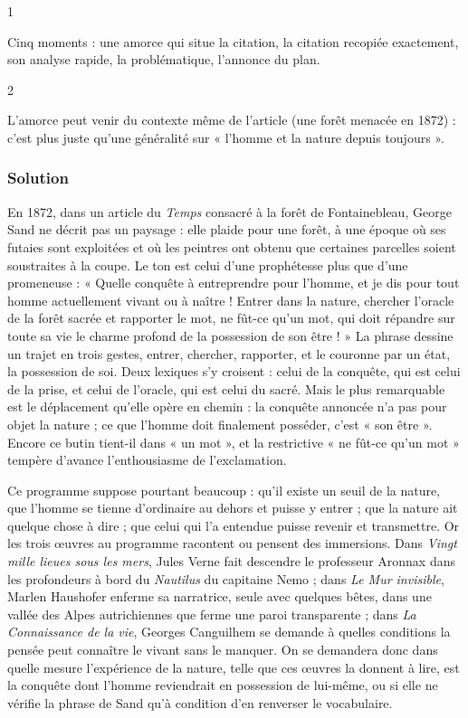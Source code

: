 \documentclass[11pt,a4paper]{article}
\begin{document}
\begin{indication}{1}

Cinq moments : une amorce qui situe la citation, la citation recopiée exactement, son analyse rapide, la problématique, l'annonce du plan.

\end{indication}

\begin{indication}{2}

L'amorce peut venir du contexte même de l'article (une forêt menacée en 1872) : c'est plus juste qu'une généralité sur « l'homme et la nature depuis toujours ».

\end{indication}

\hypertarget{solution-3}{%
\subsubsection{Solution}\label{solution-3}}

En 1872, dans un article du \emph{Temps} consacré à la forêt de Fontainebleau, George Sand ne décrit pas un paysage : elle plaide pour une forêt, à une époque où ses futaies sont exploitées et où les peintres ont obtenu que certaines parcelles soient soustraites à la coupe. Le ton est celui d'une prophétesse plus que d'une promeneuse : « Quelle conquête à entreprendre pour l'homme, et je dis pour tout homme actuellement vivant ou à naître ! Entrer dans la nature, chercher l'oracle de la forêt sacrée et rapporter le mot, ne fût-ce qu'un mot, qui doit répandre sur toute sa vie le charme profond de la possession de son être ! » La phrase dessine un trajet en trois gestes, entrer, chercher, rapporter, et le couronne par un état, la possession de soi. Deux lexiques s'y croisent : celui de la conquête, qui est celui de la prise, et celui de l'oracle, qui est celui du sacré. Mais le plus remarquable est le déplacement qu'elle opère en chemin : la conquête annoncée n'a pas pour objet la nature ; ce que l'homme doit finalement posséder, c'est « son être ». Encore ce butin tient-il dans « un mot », et la restrictive « ne fût-ce qu'un mot » tempère d'avance l'enthousiasme de l'exclamation.

Ce programme suppose pourtant beaucoup : qu'il existe un seuil de la nature, que l'homme se tienne d'ordinaire au dehors et puisse y entrer ; que la nature ait quelque chose à dire ; que celui qui l'a entendue puisse revenir et transmettre. Or les trois œuvres au programme racontent ou pensent des immersions. Dans \emph{Vingt mille lieues sous les mers}, Jules Verne fait descendre le professeur Aronnax dans les profondeurs à bord du \emph{Nautilus} du capitaine Nemo ; dans \emph{Le Mur invisible}, Marlen Haushofer enferme sa narratrice, seule avec quelques bêtes, dans une vallée des Alpes autrichiennes que ferme une paroi transparente ; dans \emph{La Connaissance de la vie}, Georges Canguilhem se demande à quelles conditions la pensée peut connaître le vivant sans le manquer. On se demandera donc dans quelle mesure l'expérience de la nature, telle que ces œuvres la donnent à lire, est la conquête dont l'homme reviendrait en possession de lui-même, ou si elle ne vérifie la phrase de Sand qu'à condition d'en renverser le vocabulaire.
\end{document}
